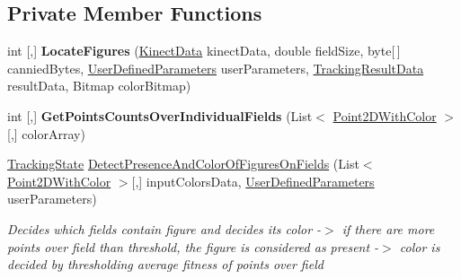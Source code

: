 \subsection*{Private Member Functions}
\begin{DoxyCompactItemize}
\item 
\mbox{\label{class_chess_tracking_1_1_image_processing_1_1_figures_algorithms_1_1_figures_localization_algorithm_a0f3c680282ec08dd0c6f7ed7b2366154}} 
int \mbox{[},\mbox{]} {\bfseries Locate\+Figures} (\mbox{\hyperlink{class_chess_tracking_1_1_image_processing_1_1_pipeline_data_1_1_kinect_data}{Kinect\+Data}} kinect\+Data, double field\+Size, byte\mbox{[}$\,$\mbox{]} cannied\+Bytes, \mbox{\hyperlink{class_chess_tracking_1_1_image_processing_1_1_pipeline_data_1_1_user_defined_parameters}{User\+Defined\+Parameters}} user\+Parameters, \mbox{\hyperlink{class_chess_tracking_1_1_image_processing_1_1_pipeline_data_1_1_tracking_result_data}{Tracking\+Result\+Data}} result\+Data, Bitmap color\+Bitmap)
\item 
\mbox{\label{class_chess_tracking_1_1_image_processing_1_1_figures_algorithms_1_1_figures_localization_algorithm_a55f21429d19d9ee3616cc81d9176f9dd}} 
int \mbox{[},\mbox{]} {\bfseries Get\+Points\+Counts\+Over\+Individual\+Fields} (List$<$ \mbox{\hyperlink{struct_chess_tracking_1_1_image_processing_1_1_pipeline_data_1_1_point2_d_with_color}{Point2\+D\+With\+Color}} $>$\mbox{[},\mbox{]} color\+Array)
\item 
\mbox{\hyperlink{class_chess_tracking_1_1_multithreading_messages_1_1_tracking_state}{Tracking\+State}} \mbox{\hyperlink{class_chess_tracking_1_1_image_processing_1_1_figures_algorithms_1_1_figures_localization_algorithm_a8e2bbbaa3cb473819582fbd20cdf3e89}{Detect\+Presence\+And\+Color\+Of\+Figures\+On\+Fields}} (List$<$ \mbox{\hyperlink{struct_chess_tracking_1_1_image_processing_1_1_pipeline_data_1_1_point2_d_with_color}{Point2\+D\+With\+Color}} $>$\mbox{[},\mbox{]} input\+Colors\+Data, \mbox{\hyperlink{class_chess_tracking_1_1_image_processing_1_1_pipeline_data_1_1_user_defined_parameters}{User\+Defined\+Parameters}} user\+Parameters)
\begin{DoxyCompactList}\small\item\em Decides which fields contain figure and decides its color -\/$>$ if there are more points over field than threshold, the figure is considered as present -\/$>$ color is decided by thresholding average fitness of points over field \end{DoxyCompactList}\item 

\end{DoxyCompactItemize}
